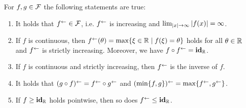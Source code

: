 \begin{proposition}\label{prop:reversal-props}
    For $f,g\in \mathcal{F}$ the following statements are true:
    \begin{enumerate}[label=(\roman*)]
        \item\label{prop:reversal-props:inner-operator} It holds that $f^{\leftarrow}\in\mathcal{F}$, i.e. $f^{\leftarrow}$ is increasing and $\lim_{\left| x \right|\rightarrow\infty} \left| f(x) \right| = \infty$.
        \item\label{prop:reversal-props:continuous} If $f$ is continuous, then $f^{\leftarrow}(\theta) = \max \{ \xi\in\mathbb{R} \mid f(\xi) = \theta \}$ holds for all $\theta\in\mathbb{R}$ and $f^{\leftarrow}$ is strictly increasing.
        Moreover, we have $f\circ f^{\leftarrow} = \mathbf{id}_{\mathbb{R}}$.
        \item\label{prop:reversal-props:inverse} If $f$ is continuous and strictly increasing, then  $f^{\leftarrow}$ is the inverse of $f$.
        \item\label{prop:reversal-props:composition-minimum} It holds that $(g\circ f)^{\leftarrow} = f^{\leftarrow}\circ g^{\leftarrow}$ and $(\min\{f,g\})^{\leftarrow} = \max\{f^{\leftarrow}, g^{\leftarrow}\}$.
        \item\label{prop:reversal-props:flip-id} If $f\geq \mathbf{id}_{\mathbb{R}}$ holds pointwise, then so does $f^{\leftarrow} \leq \mathbf{id}_{\mathbb{R}}$.
    \end{enumerate}
\end{proposition}
